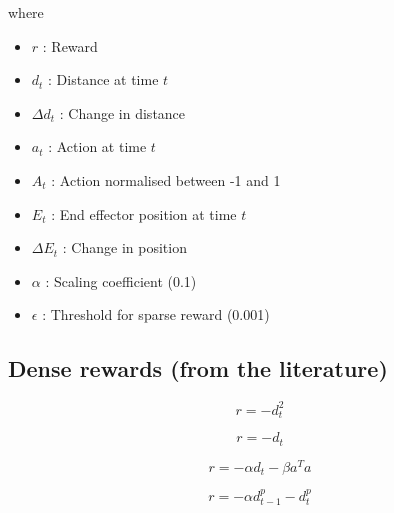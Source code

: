 \documentclass{article}
\newcommand{\norm}[1]{\left\lVert#1\right\rVert}
\begin{document}


%
%
%


%



where
\begin{itemize}  
\item $r$ : Reward
\item $d_t$ : Distance at time $t$ 
\item $\Delta d_t$ : Change in distance
\item $a_t$ : Action at time $t$ 
\item $A_t$ : Action normalised between -1 and 1 
\item $E_t$ : End effector position at time $t$
\item $\Delta E_t$ : Change in position
\item $\alpha$ : Scaling coefficient (0.1)
\item $\epsilon$ : Threshold for sparse reward (0.001)
\end{itemize}


\subsection{Dense rewards (from the literature)}

\begin{equation}
r = - d_t^2
\end{equation}


\begin{equation}
r = - d_t
\end{equation}


\begin{equation}
r = -\alpha d_t - \beta a^T a
\end{equation}

\begin{equation}
r = -\alpha d_{t-1}^p - d_t^p 
\end{equation}
\end{document}
